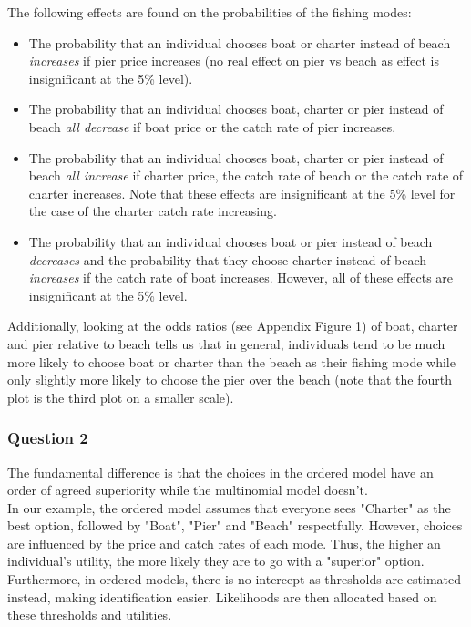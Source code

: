 \documentclass[12pt]{article}
\begin{document}
{The following effects are found on the probabilities of the fishing modes:
\begin{itemize}
\item The probability that an individual chooses boat or charter instead of beach \textit{increases} if pier price increases (no real effect on pier vs beach as effect is insignificant at the 5\% level).
\item The probability that an individual chooses boat, charter or pier instead of beach \textit{all decrease} if boat price or the catch rate of pier increases.
\item The probability that an individual chooses boat, charter or pier instead of beach \textit{all increase} if charter price, the catch rate of beach or the catch rate of charter increases. Note that these effects are insignificant at the 5\% level for the case of the charter catch rate increasing.
\item The probability that an individual chooses boat or pier instead of beach \textit{decreases} and the probability that they choose charter instead of beach \textit{increases} if the catch rate of boat increases. However, all of these effects are insignificant at the 5\% level.
\end{itemize}

Additionally, looking at the odds ratios (see Appendix Figure 1) of boat, charter and pier relative to beach tells us that in general, individuals tend to be much more likely to choose boat or charter than the beach as their fishing mode while only slightly more likely to choose the pier over the beach (note that the fourth plot is the third plot on a smaller scale).

\subsubsection*{Question 2}
The fundamental difference is that the choices in the ordered model have an order of agreed superiority while the multinomial model doesn't.\\

In our example, the ordered model assumes that everyone sees "Charter" as the best option, followed by "Boat", "Pier" and "Beach" respectfully. However, choices are influenced by the price and catch rates of each mode. Thus, the higher an individual's utility, the more likely they are to go with a "superior" option. Furthermore, in ordered models, there is no intercept as thresholds are estimated instead, making identification easier. Likelihoods are then allocated based on these thresholds and utilities.\\

}
\end{document}
